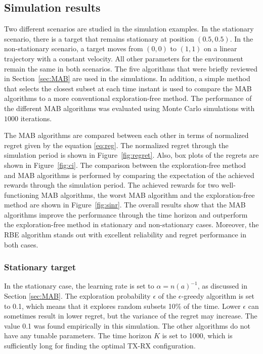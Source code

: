 \documentclass[english, 12pt, a4paper, elec, utf8, a-1b, online]{aaltothesis}
\numberwithin{equation}{section}
\begin{document}
\subsection{Simulation results}

Two different scenarios are studied in the simulation examples. 
In the stationary scenario, there is a target that remains stationary at position $(0.5, 0.5)$.
In the non-stationary scenario, a target moves from $(0, 0)$ to $(1, 1)$ on a linear trajectory with a constant velocity.
All other parameters for the environment remain the same in both scenarios.
The five algorithms that were briefly reviewed in Section~\ref{sec:MAB} are used in the simulations.
In addition, a simple method that selects the closest subset at each time instant is used to compare the MAB algorithms to a more conventional exploration-free method. 
The performance of the different MAB algorithms was evaluated using Monte Carlo simulations with $1000$ iterations.

The MAB algorithms are compared between each other in terms of normalized regret given by the equation \eqref{eq:reg}. 
The normalized regret through the simulation period is shown in Figure~\ref{fig:regret}.
Also, box plots of the regrets are shown in Figure~\ref{fig:ci}.
The comparison between the exploration-free method and MAB algorithms is performed by comparing the expectation of the achieved rewards through the simulation period.
The achieved rewards for two well-functioning MAB algorithms, 
the worst MAB algorithm and the exploration-free method are shown in Figure~\ref{fig:sinr}.
The overall results show that the MAB algorithms improve the performance through the time horizon and outperform the exploration-free method in stationary and non-stationary cases.
Moreover, the RBE algorithm stands out with excellent reliability and regret performance in both cases.

\subsubsection{Stationary target}

In the stationary case, the learning rate is set to $\alpha=n(a)^{-1}$, as discussed in Section \ref{sec:MAB}.
The exploration probability $\epsilon$ of the $\epsilon$-greedy algorithm is set to 0.1, which means that it explores random subsets 10\% of the time.
Lower $\epsilon$ can sometimes result in lower regret, but the variance of the regret may increase.
The value 0.1 was found empirically in this simulation.
The other algorithms do not have any tunable parameters.
The time horizon $K$ is set to 1000, which is sufficiently long for finding the optimal TX-RX configuration.
\end{document}
